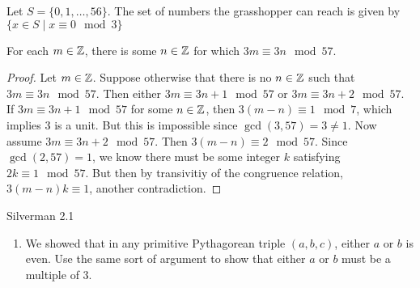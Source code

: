 \documentclass[10pt,twoside]{amsart}
\begin{document}
\begin{exercises}
\begin{enumerate}[label = (\alph*)]
{\begin{minipage}{\dimexpr\linewidth-2\fboxrule-2\fboxsep}
    Let $S=\{0,1,\ldots, 56\}$. The set of numbers the grasshopper can reach is given by $\{x \in S \mid x \equiv 0 \mod 3 \}$

    \begin{claim*}For each $m \in \mathbb{Z}$, there is some $n \in \mathbb{Z}$ for which $3m \equiv 3n \mod 57$.
    \end{claim*}

    \begin{proof}
        Let $m \in \mathbb{Z}$. Suppose otherwise that there is no $n \in \mathbb{Z}$ such that $3m \equiv 3n \mod 57$. Then either $3m \equiv 3n + 1 \mod 57$ or $3m \equiv 3n+2 \mod 57$. If $3m \equiv 3n+1 \mod 57$ for some $n \in \mathbb{Z}$, then $3(m-n) \equiv 1 \mod 7$, which implies $3$ is a unit. But this is impossible since $\gcd(3,57)=3\neq 1$. Now assume $3m \equiv 3n+2 \mod 57$. Then $3(m-n) \equiv 2 \mod 57$. Since $\gcd(2,57)=1$, we know there must be some integer $k$ satisfying $2k \equiv 1 \mod 57$. But then by transivitiy of the congruence relation, $3(m-n)k \equiv 1$, another contradiction.
    \end{proof}

\end{minipage}}


\end{enumerate}


\item Silverman 2.1

    \begin{enumerate}[label=(\alph*)]
        \item We showed that in any primitive Pythagorean triple $(a,b,c)$, either $a$ or $b$ is even. Use the same sort of argument to show that either $a$ or $b$ must be a multiple of $3$.


\end{enumerate}
\end{exercises}
\end{document}
